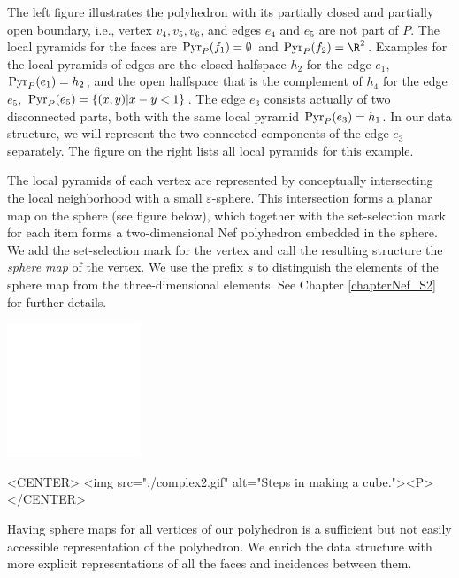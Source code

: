     The left figure illustrates the polyhedron with
    its partially closed and partially open boundary, i.e., vertex 
    $v_4, v_5, v_6$, and edges $e_4$ and $e_5$ are not part of $P$.
    The local pyramids for the faces are $\pyr_P(f_1) = \emptyset$
    and $\pyr_P(f_2) = \R^2$. Examples for the local pyramids of edges
    are the closed halfspace $h_2$ for the edge $e_1$, $\pyr_P(e_1) = h_2$,
    and the open halfspace that is the complement of $h_4$ for the 
    edge $e_5$, $\pyr_P(e_5) =
    \{(x,y) | x - y < 1\}$. The edge $e_3$ consists actually of two
    disconnected parts, both with the same local pyramid $\pyr_P(e_3) = h_1$.
    In our data structure, we will represent the two connected
    components of the edge $e_3$ separately.
    The figure on the right  
    lists all local pyramids for this example.


The local pyramids of each vertex are represented by
conceptually intersecting the local neighborhood with a small
$\varepsilon$-sphere. This intersection forms a planar map on the
sphere (see figure below), which together with the set-selection
mark for each item forms a two-dimensional Nef polyhedron embedded in
the sphere. We add the set-selection mark for the vertex and call the
resulting structure the \emph{sphere map} of the vertex.  
We use the prefix $s$ to distinguish the elements of the sphere map
from the three-dimensional elements. See Chapter \ref{chapterNef_S2} 
for further details.

\begin{ccTexOnly}
    \begin{center}
      \parbox{0.3\textwidth}{%
          \includegraphics[width=0.3\textwidth]{Nef_3/fig/complex2}%
      }
    \end{center}
\end{ccTexOnly}

\begin{ccHtmlOnly}
    <CENTER>
        <img src="./complex2.gif" alt="Steps in making a cube."><P>
    </CENTER>
\end{ccHtmlOnly}

Having sphere maps for all vertices of our polyhedron is a sufficient
but not easily accessible representation of the polyhedron. We enrich
the data structure with more explicit representations of all the faces
and incidences between them. 

